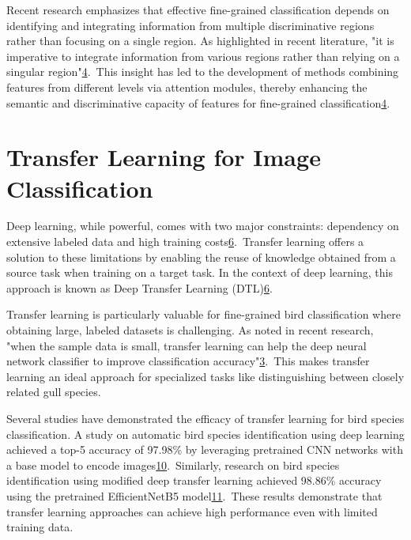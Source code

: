 \documentclass[a4paper,12pt]{article}
\begin{document}
Recent research emphasizes that effective fine-grained classification depends on identifying and integrating information from multiple discriminative regions rather than focusing on a single region. As highlighted in recent literature, "it is imperative to integrate information from various regions rather than relying on a singular region"\href{https://www.frontiersin.org/journals/neurorobotics/articles/10.3389/fnbot.2024.1391791/full}{4}. This insight has led to the development of methods combining features from different levels via attention modules, thereby enhancing the semantic and discriminative capacity of features for fine-grained classification\href{https://www.frontiersin.org/journals/neurorobotics/articles/10.3389/fnbot.2024.1391791/full}{4}.

\section*{Transfer Learning for Image Classification}
Deep learning, while powerful, comes with two major constraints: dependency on extensive labeled data and high training costs\href{https://arxiv.org/abs/2201.09679}{6}. Transfer learning offers a solution to these limitations by enabling the reuse of knowledge obtained from a source task when training on a target task. In the context of deep learning, this approach is known as Deep Transfer Learning (DTL)\href{https://arxiv.org/abs/2201.09679}{6}.

Transfer learning is particularly valuable for fine-grained bird classification where obtaining large, labeled datasets is challenging. As noted in recent research, "when the sample data is small, transfer learning can help the deep neural network classifier to improve classification accuracy"\href{https://ijece.iaescore.com/index.php/IJECE/article/view/24833}{3}. This makes transfer learning an ideal approach for specialized tasks like distinguishing between closely related gull species.

Several studies have demonstrated the efficacy of transfer learning for bird species classification. A study on automatic bird species identification using deep learning achieved a top-5 accuracy of 97.98\% by leveraging pretrained CNN networks with a base model to encode images\href{https://www.semanticscholar.org/paper/41b0718279f408654094557156d4eeeb0067b2c4}{10}. Similarly, research on bird species identification using modified deep transfer learning achieved 98.86\% accuracy using the pretrained EfficientNetB5 model\href{https://www.semanticscholar.org/paper/770ee68d1b136cd098a018a399d1f69af29faae0}{11}. These results demonstrate that transfer learning approaches can achieve high performance even with limited training data.
\end{document}
